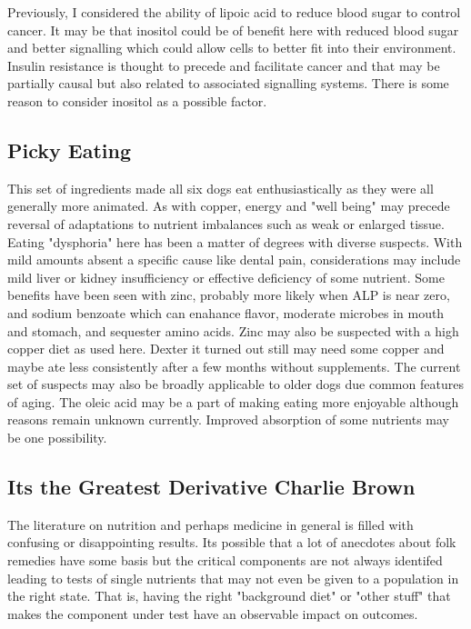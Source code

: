 Previously, I considered the ability of lipoic acid
to reduce blood sugar to control cancer. It may be that inositol 
could be of benefit here with reduced blood sugar and better signalling
which could allow cells to better fit into their environment. 
Insulin resistance is thought to precede and facilitate cancer 
\cite{PMID41202839} and that may be partially causal but also
related to associated signalling systems. There is some reason to
consider inositol as a possible factor. 
 
\subsection{Picky Eating }


This set of ingredients made all six dogs eat enthusiastically
as they were all generally more animated. As with copper, energy
and "well being" may precede reversal of adaptations
to nutrient imbalances such as weak or enlarged tissue. 
Eating "dysphoria" here has been a matter of degrees with diverse
suspects. With mild amounts absent a specific cause like dental pain,
considerations may include mild liver or kidney insufficiency or 
effective deficiency of some nutrient. Some benefits have been
seen with zinc, probably more likely when ALP is near zero,
and sodium benzoate which can enahance flavor, moderate microbes in mouth
and stomach,
and sequester amino acids. Zinc may also be suspected with a high
copper diet as used here. 
Dexter it turned out still may need some copper and maybe ate less consistently
after a few months without supplements. 
The current set of suspects may also
be broadly applicable to older dogs due common features of aging.
The oleic acid may be a part of making eating more 
enjoyable although reasons remain unknown currently. Improved
absorption of some nutrients may be one possibility.


\subsection{Its the Greatest Derivative Charlie Brown }

The literature on nutrition and perhaps medicine in general
is filled with confusing or disappointing results. 
Its possible that a lot of anecdotes about folk remedies have
some basis but the critical components are not always identifed
leading to tests of single nutrients that may not even be given
to a population in the right state. That is, having the right
"background diet" or "other stuff" that makes the component
under test have an observable impact on outcomes.  

